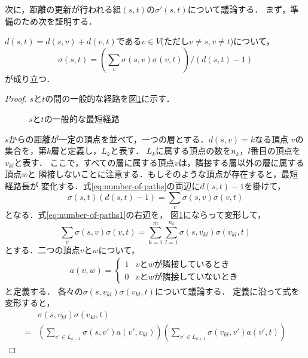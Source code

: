 次に，距離の更新が行われる組$(s,t)$の$\sigma'(s,t)$について議論する．
まず，準備のため次を証明する．
\begin{theorem}
  $d(s,t)=d(s,v)+d(v,t)$である$v\in V$(ただし$v\neq s,v\neq t$)について，
  \begin{equation}
    \label{eq:number-of-paths}
    \sigma(s,t)=\left(
    \sum_{v}\sigma(s,v)\sigma(v,t)\right) / (d(s,t)-1)
  \end{equation}
  が成り立つ．
\end{theorem}
\begin{proof}
  $s$と$t$の間の一般的な経路を図\ref{fig:proof-number-of-paths}に示す．
  \begin{figure}
    \centering
    \def\svgwidth{.5\columnwidth}
    
    \caption{$s$と$t$の一般的な最短経路}
    \label{fig:proof-number-of-paths}
  \end{figure}
  $s$からの距離が一定の頂点を並べて，一つの層とする．$d(s,v)=k$なる頂点
  $v$の集合を，第$k$層と定義し，$L_k$と表す．
  $L_k$に属する頂点の数を$n_k$，$l$番目の頂点を$v_{kl}$と表す．
  ここで，すべての層に属する頂点$v$は，隣接する層以外の層に属する頂点$w$と
  隣接しないことに注意する．もしそのような頂点が存在すると，最短経路長が
  変化する．式\ref{eq:number-of-paths}の両辺に$d(s,t)-1$を掛けて，
  \begin{equation}
    \sigma(s,t)(d(s,t)-1)=\sum_{v}\sigma(s,v)\sigma(v,t)
    \label{eq:number-of-paths1}
  \end{equation}
  となる．式\ref{eq:number-of-paths1}の右辺を，
  図\ref{fig:proof-number-of-paths}にならって変形して，
  \begin{equation}
    \sum_{v}\sigma(s,v)\sigma(v,t)=
    \sum_{k=1}^m\sum_{l=1}^{n_k}\sigma(s,v_{kl})\sigma(v_{kl},t)
    \label{eq:number-of-paths2}
  \end{equation}
  とする．二つの頂点$v$と$w$について，
  \begin{align*}
    a(v,w)=
    \begin{cases}
      1 & vとwが隣接しているとき \\
      0 & vとwが隣接していないとき
    \end{cases}
  \end{align*}
  と定義する．
  各々の$\sigma(s,v_{kl})\sigma(v_{kl},t)$について議論する．
  定義に沿って式を変形すると，
  \begin{align}
    &\sigma(s,v_{kl})\sigma(v_{kl},t)\nonumber\\
    =&\left(\sum_{v'\in L_{k-1}}\sigma(s,v')a(v',v_{kl})\right)
    \left(\sum_{v'\in L_{k+1}}\sigma(v_{kl},v')a(v',t)\right)

\end{align}
\end{proof}
